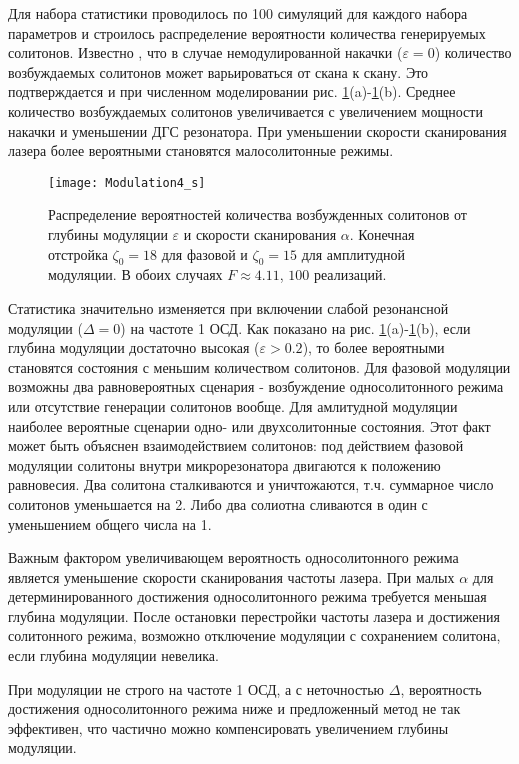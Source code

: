 Для набора статистики проводилось по 100 симуляций для каждого набора параметров и строилось распределение вероятности количества генерируемых солитонов. Известно \cite{Herr2014, Karpov2016}, что в случае немодулированной накачки ($\varepsilon=0$) количество возбуждаемых солитонов может варьироваться от скана к скану. Это подтверждается и при численном моделировании рис. \ref{Mod4}(a)-\ref{Mod4}(b). Среднее количество возбуждаемых солитонов увеличивается с увеличением мощности накачки и уменьшении ДГС резонатора. При уменьшении скорости сканирования лазера более вероятными становятся малосолитонные режимы.

\begin{figure}[ht]
\centering
  \texttt{[image: Modulation4\_s]}
  \caption{Распределение вероятностей количества возбужденных солитонов от глубины модуляции $\varepsilon$ и скорости сканирования $\alpha$. Конечная отстройка $\zeta_0=18$ для фазовой и $\zeta_0=15$ для амплитудной модуляции. В обоих случаях $F\approx 4.11$, $100$ реализаций.}
  \label{Mod4}
\end{figure}

Статистика значительно изменяется при включении слабой резонансной модуляции ($\Delta=0$) на частоте 1 ОСД. Как показано на рис. \ref{Mod4}(a)-\ref{Mod4}(b), если глубина модуляции достаточно высокая ($\varepsilon> 0.2$), то более вероятными становятся состояния с меньшим количеством солитонов. Для фазовой модуляции возможны два равновероятных сценария - возбуждение односолитонного режима или отсутствие генерации солитонов вообще. Для амлитудной модуляции наиболее вероятные сценарии одно- или двухсолитонные состояния. Этот факт может быть объяснен взаимодействием солитонов: под действием фазовой модуляции солитоны внутри микрорезонатора двигаются к положению равновесия. Два солитона сталкиваются и уничтожаются, т.ч. суммарное число солитонов уменьшается на 2. Либо два солиотна сливаются в один с уменьшением общего числа на 1.

Важным фактором увеличивающем вероятность односолитонного режима является уменьшение скорости сканирования частоты лазера. При малых $\alpha$ для детерминированного достижения односолитонного режима требуется меньшая глубина модуляции. После остановки перестройки частоты лазера и достижения солитонного режима, возможно отключение модуляции с сохранением солитона, если глубина модуляции невелика.

При модуляции не строго на частоте 1 ОСД, а с неточностью $\Delta$, вероятность достижения односолитонного режима ниже и предложенный метод не так эффективен, что частично можно компенсировать увеличением глубины модуляции.


